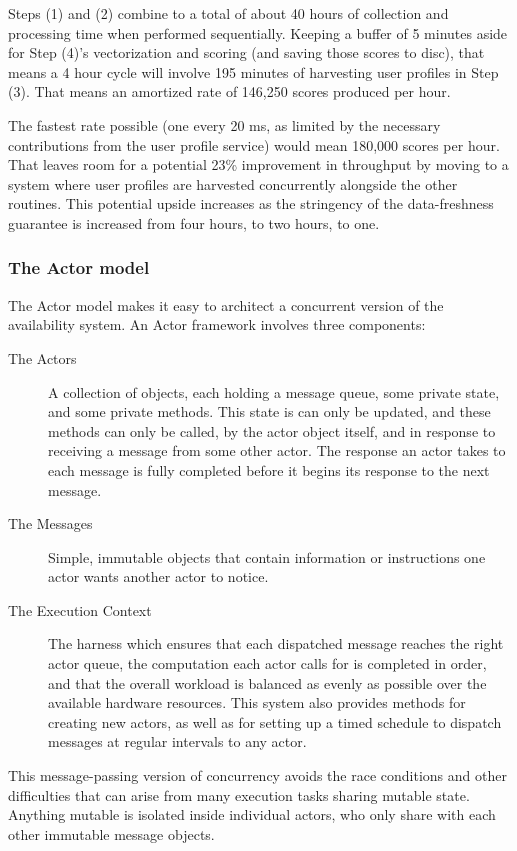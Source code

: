 \documentclass{article}
\begin{document}
 Steps (1) and (2) combine to a total of about 40 hours of collection and
processing time when performed sequentially. Keeping a buffer of 5 minutes aside
for Step (4)'s vectorization and scoring (and saving those scores to disc), that
means a 4 hour cycle will involve 195 minutes of harvesting user profiles in
Step (3). That means an amortized rate of 146,250 scores produced per hour. 

The fastest rate possible (one every 20 ms, as limited by the necessary
contributions from the user profile service) would mean 180,000 scores per
hour. That leaves room for a potential 23\% improvement in throughput
by moving to a system where user profiles are harvested concurrently
alongside the other routines. This potential upside increases as the
stringency of the data-freshness guarantee is increased from four
hours, to two hours, to one.

\subsubsection{The Actor model}

The Actor model makes it easy to architect a concurrent version of the
availability system. An Actor framework involves three components:

\begin{description}
\item[The Actors] A collection of objects, each holding a message queue, some 
private state, and some private methods. This state is can only be updated, and
these methods can only be called, by the actor object itself, and in response to 
receiving a message from some other actor. The response an actor takes to each
message is fully completed before it begins its response to the next message.
\item[The Messages] Simple, immutable objects that contain information or 
instructions one actor wants another actor to notice. 
\item[The Execution Context] The harness which ensures that each dispatched 
message reaches the right actor queue, the computation each actor calls for is
completed in order, and that the overall workload is balanced as evenly as possible
over the available hardware resources. This system also provides methods for
creating new actors, as well as for setting up a timed schedule to dispatch
messages at regular intervals to any actor.
\end{description}

This message-passing version of concurrency avoids the race conditions and
other difficulties that can arise from many execution tasks sharing mutable state.
Anything mutable is isolated inside individual actors, who only share with each
other immutable message objects.
\end{document}
